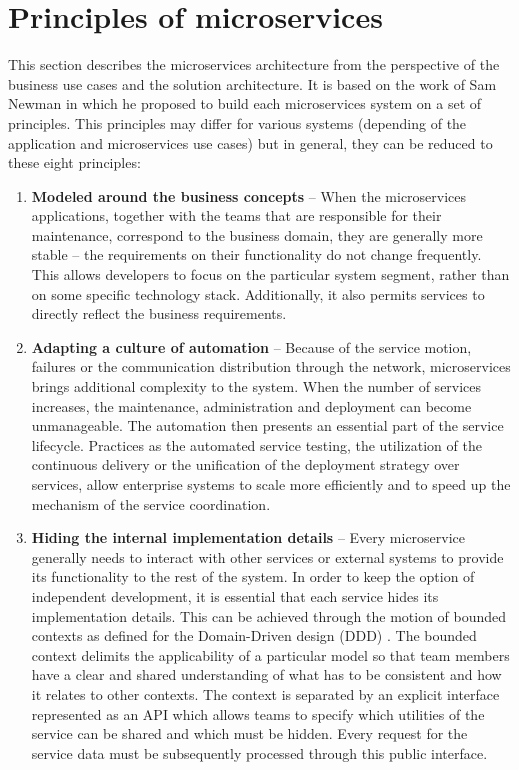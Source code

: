\documentclass[oneside,
  digital, %
  table,   %
  lof,     %
  lot,     %
]{fithesis3}
\begin{document}
\section{Principles of microservices}

This section describes the microservices architecture from the perspective of the business use cases and the solution architecture. It is based on the work of Sam Newman \cite{building_ms, principles_of_microservices} in which he proposed to build each microservices system on a set of principles. This principles may differ for various systems (depending of the application and microservices use cases) but in general, they can be reduced to these eight principles:

\begin{enumerate}
	
	\item \textbf{Modeled around the business concepts} -- When the  microservices applications, together with the teams that are responsible for their maintenance, correspond to the business domain, they are generally more stable -- the requirements on their functionality do not change frequently. This allows developers to focus on the particular system segment, rather than on some specific technology stack. Additionally, it also permits services to directly reflect the business requirements.
	
	\item \textbf{Adapting a culture of automation} -- Because of the  service motion, failures or the communication distribution through the network, microservices brings additional complexity to the system. When the number of services increases, the maintenance, administration and deployment can become unmanageable. The automation then presents an essential part of the service lifecycle. Practices as the automated service testing, the utilization of the continuous delivery or the unification of the deployment strategy over services, allow enterprise systems to scale more efficiently and to speed up the mechanism of the service coordination.
	
	\item \textbf{Hiding the internal implementation details} -- Every microservice generally needs to interact with other services or external systems to provide its functionality to the rest of the system. In order to keep the option of independent development, it is essential that each service hides its implementation details. This can be achieved through the motion of bounded contexts as defined for the Domain-Driven design (DDD) \cite{ddd}. The bounded context delimits the applicability of a particular model so that team members have a clear and shared understanding of what has to be consistent and how it relates to other contexts. The context is separated by an explicit interface represented as an API which allows teams to specify which utilities of the service can be shared and which must be hidden. Every request for the service data must be subsequently processed through this public interface.
	

\end{enumerate}
\end{document}
